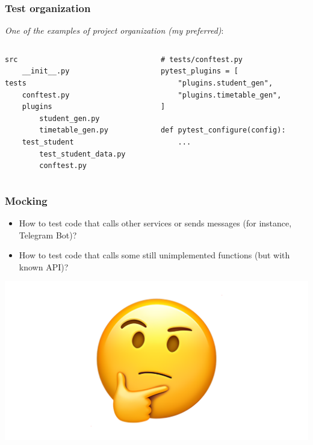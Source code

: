 \documentclass[compress]{beamer}
\begin{document}




\begin{frame}[fragile]
\frametitle{Test organization}

\textit{One of the examples of project organization (my preferred)}:

\begin{columns}[T]
\begin{column}{.5\textwidth}
\begin{verbatim}
src
    __init__.py
tests
    conftest.py
    plugins
        student_gen.py
        timetable_gen.py
    test_student
        test_student_data.py
        conftest.py
\end{verbatim}
\end{column}

\begin{column}{.5\textwidth}
\begin{verbatim}
# tests/conftest.py
pytest_plugins = [
    "plugins.student_gen",
    "plugins.timetable_gen",
]

def pytest_configure(config):
    ...
\end{verbatim}
\end{column}
\end{columns}

\end{frame}


\begin{frame}[fragile]
\frametitle{Mocking}

\begin{itemize}
    \item How to test code that calls other services or sends messages (for instance, Telegram Bot)?
    \item How to test code that calls some still unimplemented functions (but with known API)?
\end{itemize}

\vspace{0.2in}

\begin{center}
\includegraphics[scale=0.2]{thinking_emoji.png}
\end{center}

\end{frame}
\end{document}
